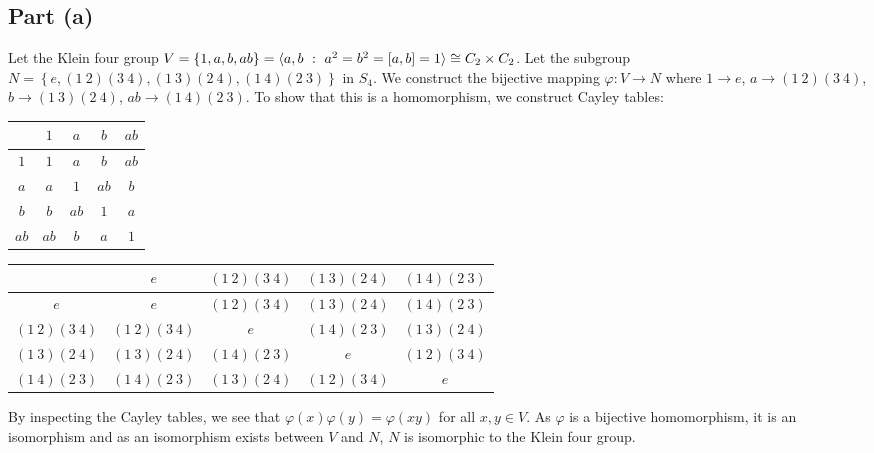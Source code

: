 \documentclass{article}
\begin{document}
\subsection*{Part (a)}
Let the Klein four group $V = \left\{1, a, b, ab\right\} = \langle a,b \ : \  a^2 = b^2 = \left[a,b\right] = 1\rangle \cong C_2 \times C_2$. Let the subgroup $N = \left\{ e, \left(1~2\right)\left(3~4\right), \left(1~3\right)\left(2~4\right), \left(1~4\right)\left(2~3\right)\right\}$ in $S_4$. We construct the bijective mapping $\varphi : V \to N$ where $1 \to e$, $a \to \left(1~2\right)\left(3~4\right)$, $b \to \left(1~3\right)\left(2~4\right)$, $ab \to \left(1~4\right)\left(2~3\right)$. To show that this is a homomorphism, we construct Cayley tables:
\begin{center}
\begin{tabular}{|c||c|c|c|c|}
    \hline
     & $1$ & $a$ & $b$ & $ab$ \\
    \hline
    \hline
    $1$ & $1$ & $a$ & $b$ & $ab$ \\
    \hline
    $a$ & $a$ & $1$ & $ab$ & $b$ \\
    \hline
    $b$ & $b$ & $ab$ & $1$ & $a$ \\
    \hline
    $ab$ & $ab$ & $b$ & $a$ & $1$ \\
    \hline
\end{tabular}


\vspace{0.25in}

\begin{tabular}{|c||c|c|c|c|}
    \hline
     & $e$ & $\left(1~2\right)\left(3~4\right)$ & $\left(1~3\right)\left(2~4\right)$ & $\left(1~4\right)\left(2~3\right)$ \\
    \hline
    \hline
    $e$ & $e$ & $\left(1~2\right)\left(3~4\right)$ & $\left(1~3\right)\left(2~4\right)$ & $\left(1~4\right)\left(2~3\right)$ \\
    \hline
    $\left(1~2\right)\left(3~4\right)$ & $\left(1~2\right)\left(3~4\right)$ & $e$ & $\left(1~4\right)\left(2~3\right)$ & $\left(1~3\right)\left(2~4\right)$ \\
    \hline
    $\left(1~3\right)\left(2~4\right)$ & $\left(1~3\right)\left(2~4\right)$ & $\left(1~4\right)\left(2~3\right)$ & $e$ & $\left(1~2\right)\left(3~4\right)$ \\
    \hline
    $\left(1~4\right)\left(2~3\right)$ & $\left(1~4\right)\left(2~3\right)$ & $\left(1~3\right)\left(2~4\right)$ & $\left(1~2\right)\left(3~4\right)$ & $e$ \\
    \hline
\end{tabular}
\end{center}
By inspecting the Cayley tables, we see that $\varphi\left(x\right)\varphi\left(y\right) = \varphi\left(xy\right)$ for all $x, y \in V$. As $\varphi$ is a bijective homomorphism, it is an isomorphism and as an isomorphism exists between $V$ and $N$, $N$ is isomorphic to the Klein four group.
\end{document}
